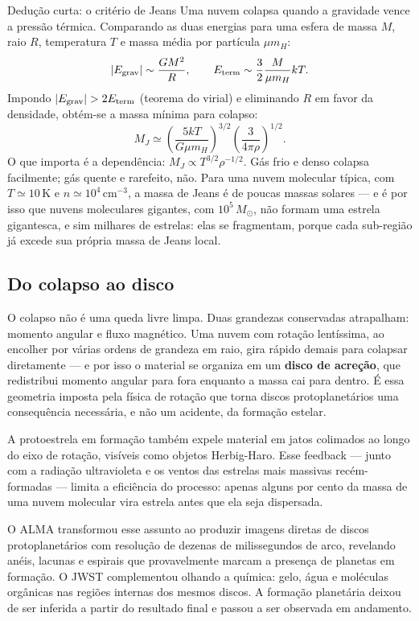 \documentclass[11pt,a4paper]{article}
\begin{document}
\begin{lessonblock}[borderline west={2pt}{0pt}{astroGold}]{Dedução curta: o critério de Jeans}
Uma nuvem colapsa quando a gravidade vence a pressão térmica. Comparando as duas energias para uma esfera de massa $M$, raio $R$, temperatura $T$ e massa média por partícula $\mu m_H$:
\[
|E_{\rm grav}|\sim\frac{GM^{2}}{R},\qquad E_{\rm term}\sim\frac{3}{2}\frac{M}{\mu m_H}kT.
\]
Impondo $|E_{\rm grav}|>2E_{\rm term}$ (teorema do virial) e eliminando $R$ em favor da densidade, obtém-se a massa mínima para colapso:
\[
M_J\simeq\left(\frac{5kT}{G\mu m_H}\right)^{3/2}\left(\frac{3}{4\pi\rho}\right)^{1/2}.
\]
O que importa é a dependência: $M_J\propto T^{3/2}\rho^{-1/2}$. Gás frio e denso colapsa facilmente; gás quente e rarefeito, não. Para uma nuvem molecular típica, com $T\simeq10\,\mathrm{K}$ e $n\simeq10^{4}\,\mathrm{cm^{-3}}$, a massa de Jeans é de poucas massas solares --- e é por isso que nuvens moleculares gigantes, com $10^{5}\,M_\odot$, não formam uma estrela gigantesca, e sim milhares de estrelas: elas se fragmentam, porque cada sub-região já excede sua própria massa de Jeans local.
\end{lessonblock}

\subsection*{Do colapso ao disco}

O colapso não é uma queda livre limpa. Duas grandezas conservadas atrapalham: momento angular e fluxo magnético. Uma nuvem com rotação lentíssima, ao encolher por várias ordens de grandeza em raio, gira rápido demais para colapsar diretamente --- e por isso o material se organiza em um \textbf{disco de acreção}, que redistribui momento angular para fora enquanto a massa cai para dentro. É essa geometria imposta pela física de rotação que torna discos protoplanetários uma consequência necessária, e não um acidente, da formação estelar.

A protoestrela em formação também expele material em jatos colimados ao longo do eixo de rotação, visíveis como objetos Herbig-Haro. Esse feedback --- junto com a radiação ultravioleta e os ventos das estrelas mais massivas recém-formadas --- limita a eficiência do processo: apenas alguns por cento da massa de uma nuvem molecular vira estrela antes que ela seja dispersada.

O ALMA transformou esse assunto ao produzir imagens diretas de discos protoplanetários com resolução de dezenas de milissegundos de arco, revelando anéis, lacunas e espirais que provavelmente marcam a presença de planetas em formação. O JWST complementou olhando a química: gelo, água e moléculas orgânicas nas regiões internas dos mesmos discos. A formação planetária deixou de ser inferida a partir do resultado final e passou a ser observada em andamento.
\end{document}
